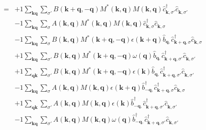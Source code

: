 \begin{align*}
	[\eta, H] = 	&+1 \sum_{ \mathbf{k} \mathbf{q} } \sum_{ \sigma' } B( \mathbf{k}+\mathbf{q}, -\mathbf{q} )  M^*( \mathbf{k}, \mathbf{q} )  M( \mathbf{k}, \mathbf{q} )   \hat{c}_{ \mathbf{k}, \sigma' }^\dagger  \hat{c}_{ \mathbf{k}, \sigma' }^{\phantom{\dagger}}  \\
	&-1 \sum_{ \mathbf{k} \mathbf{q} } \sum_{ \sigma } A( \mathbf{k}, \mathbf{q} )  M^*( \mathbf{k}, \mathbf{q} )  M( \mathbf{k}, \mathbf{q} )   \hat{c}_{ \mathbf{k}, \sigma }^\dagger  \hat{c}_{ \mathbf{k}, \sigma }^{\phantom{\dagger}}  \\
	&-1 \sum_{ \mathbf{k} \mathbf{q} } \sum_{ \sigma } B( \mathbf{k}, \mathbf{q} )  M^*( \mathbf{k}+\mathbf{q}, -\mathbf{q} )  \epsilon( \mathbf{k}+\mathbf{q} )   \hat{b}_{ \mathbf{q}, }^{\phantom{\dagger}} \hat{c}_{ \mathbf{k}+\mathbf{q}, \sigma }^\dagger  \hat{c}_{ \mathbf{k}, \sigma }^{\phantom{\dagger}}  \\
	&+1 \sum_{ \mathbf{k} \mathbf{q} } \sum_{ \sigma' } B( \mathbf{k}, \mathbf{q} )  M^*( \mathbf{k}+\mathbf{q}, -\mathbf{q} )  \omega( \mathbf{q} )   \hat{b}_{ \mathbf{q}, }^{\phantom{\dagger}} \hat{c}_{ \mathbf{k}+\mathbf{q}, \sigma' }^\dagger  \hat{c}_{ \mathbf{k}, \sigma' }^{\phantom{\dagger}}  \\
	&+1 \sum_{ \mathbf{q} \mathbf{k} } \sum_{ \sigma' } B( \mathbf{k}, \mathbf{q} )  M^*( \mathbf{k}+\mathbf{q}, -\mathbf{q} )  \epsilon( \mathbf{k} )   \hat{b}_{ \mathbf{q}, }^{\phantom{\dagger}} \hat{c}_{ \mathbf{k}+\mathbf{q}, \sigma' }^\dagger  \hat{c}_{ \mathbf{k}, \sigma' }^{\phantom{\dagger}}  \\
	&-1 \sum_{ \mathbf{k} \mathbf{q} } \sum_{ \sigma } A( \mathbf{k}, \mathbf{q} )  M( \mathbf{k}, \mathbf{q} )  \epsilon( \mathbf{k}+\mathbf{q} )   \hat{b}_{ -\mathbf{q}, }^\dagger  \hat{c}_{ \mathbf{k}+\mathbf{q}, \sigma }^\dagger  \hat{c}_{ \mathbf{k}, \sigma }^{\phantom{\dagger}}  \\
	&+1 \sum_{ \mathbf{q} \mathbf{k} } \sum_{ \sigma' } A( \mathbf{k}, \mathbf{q} )  M( \mathbf{k}, \mathbf{q} )  \epsilon( \mathbf{k} )   \hat{b}_{ -\mathbf{q}, }^\dagger  \hat{c}_{ \mathbf{k}+\mathbf{q}, \sigma' }^\dagger  \hat{c}_{ \mathbf{k}, \sigma' }^{\phantom{\dagger}}  \\
	&-1 \sum_{ \mathbf{k} \mathbf{q} } \sum_{ \sigma' } A( \mathbf{k}, \mathbf{q} )  M( \mathbf{k}, \mathbf{q} )  \omega( \mathbf{q} )   \hat{b}_{ -\mathbf{q}, }^\dagger  \hat{c}_{ \mathbf{k}+\mathbf{q}, \sigma' }^\dagger  \hat{c}_{ \mathbf{k}, \sigma' }^{\phantom{\dagger}}  \\

\end{align*}
